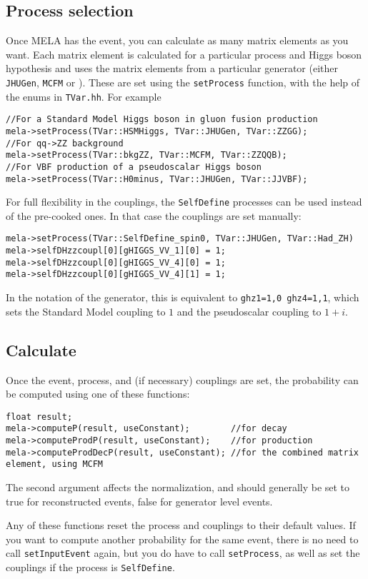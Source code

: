 \documentclass[aps,superscriptaddress,nofootinbib]{revtex4}
\begin{document}
\subsection{Process selection}
Once MELA has the event, you can calculate as many matrix elements as you want.  Each matrix element is calculated for a particular process and Higgs boson hypothesis and uses the matrix elements from a particular generator (either \texttt{JHUGen}, \texttt{MCFM} or ).  These are set using the \texttt{setProcess} function, with the help of the enums in \texttt{TVar.hh}.  For example
\begin{verbatim}
//For a Standard Model Higgs boson in gluon fusion production
mela->setProcess(TVar::HSMHiggs, TVar::JHUGen, TVar::ZZGG);
//For qq->ZZ background
mela->setProcess(TVar::bkgZZ, TVar::MCFM, TVar::ZZQQB);
//For VBF production of a pseudoscalar Higgs boson
mela->setProcess(TVar::H0minus, TVar::JHUGen, TVar::JJVBF);
\end{verbatim}

For full flexibility in the couplings, the \texttt{SelfDefine} processes can be used instead of the pre-cooked ones.  In that case the couplings are set manually:
\begin{verbatim}
mela->setProcess(TVar::SelfDefine_spin0, TVar::JHUGen, TVar::Had_ZH)
mela->selfDHzzcoupl[0][gHIGGS_VV_1][0] = 1;
mela->selfDHzzcoupl[0][gHIGGS_VV_4][0] = 1;
mela->selfDHzzcoupl[0][gHIGGS_VV_4][1] = 1;
\end{verbatim}
In the notation of the generator, this is equivalent to \texttt{ghz1=1,0 ghz4=1,1}, which sets the Standard Model coupling to $1$ and the pseudoscalar coupling to $1+i$.

\subsection{Calculate}
Once the event, process, and (if necessary) couplings are set, the probability can be computed using one of these functions:
\begin{verbatim}
float result;
mela->computeP(result, useConstant);        //for decay
mela->computeProdP(result, useConstant);    //for production
mela->computeProdDecP(result, useConstant); //for the combined matrix element, using MCFM
\end{verbatim}
The second argument affects the normalization, and should generally be set to true for reconstructed events, false for generator level events.

Any of these functions reset the process and couplings to their default values.  If you want to compute another probability for the same event, there is no need to call \texttt{setInputEvent} again, but you do have to call \texttt{setProcess}, as well as set the couplings if the process is \texttt{SelfDefine}.
\end{document}
